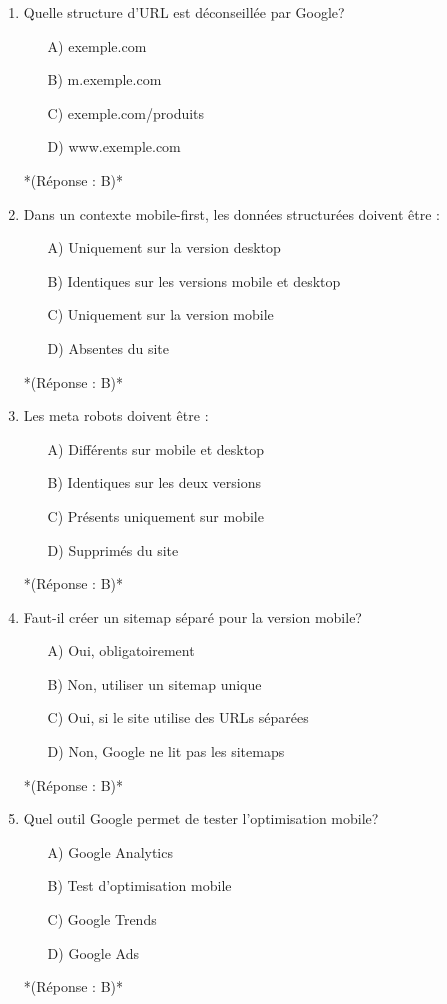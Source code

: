 \documentclass[12pt,a4paper,twoside]{report}
\begin{document}
\begin{enumerate}
\item Quelle structure d'URL est déconseillée par Google?
\begin{itemize}
\item[A)] exemple.com
\item[B)] m.exemple.com
\item[C)] exemple.com/produits
\item[D)] www.exemple.com
\end{itemize}
*(Réponse : B)*

\item Dans un contexte mobile-first, les données structurées doivent être :
\begin{itemize}
\item[A)] Uniquement sur la version desktop
\item[B)] Identiques sur les versions mobile et desktop
\item[C)] Uniquement sur la version mobile
\item[D)] Absentes du site
\end{itemize}
*(Réponse : B)*

\item Les meta robots doivent être :
\begin{itemize}
\item[A)] Différents sur mobile et desktop
\item[B)] Identiques sur les deux versions
\item[C)] Présents uniquement sur mobile
\item[D)] Supprimés du site
\end{itemize}
*(Réponse : B)*

\item Faut-il créer un sitemap séparé pour la version mobile?
\begin{itemize}
\item[A)] Oui, obligatoirement
\item[B)] Non, utiliser un sitemap unique
\item[C)] Oui, si le site utilise des URLs séparées
\item[D)] Non, Google ne lit pas les sitemaps
\end{itemize}
*(Réponse : B)*

\item Quel outil Google permet de tester l'optimisation mobile?
\begin{itemize}
\item[A)] Google Analytics
\item[B)] Test d'optimisation mobile
\item[C)] Google Trends
\item[D)] Google Ads
\end{itemize}
*(Réponse : B)*


\end{enumerate}
\end{document}
